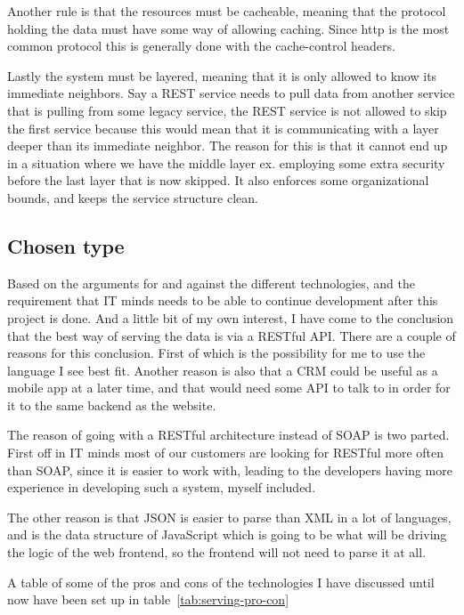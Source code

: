 Another rule is that the resources must be cacheable, meaning that the protocol holding the data must have some way of allowing caching. Since http is the most common protocol this is generally done with the cache-control headers\cite{rest:elkstein:architeture}.

Lastly the system must be layered\cite{rest:uci}, meaning that it is only allowed to know its immediate neighbors. Say a REST service needs to pull data from another service that is pulling from some legacy service, the REST service is not allowed to skip the first service because this would mean that it is communicating with a layer deeper than its immediate neighbor. The reason for this is that it cannot end up in a situation where we have the middle layer ex. employing some extra security before the last layer that is now skipped. It also enforces some organizational bounds, and keeps the service structure clean.

\subsection{Chosen type }
\label{sub:Chosen type}
Based on the arguments for and against the different technologies, and the requirement that IT minds needs to be able to continue development after this project is done. And a little bit of my own interest, I have come to the conclusion that the best way of serving the data is via a RESTful API. There are a couple of reasons for this conclusion. First of which is the possibility for me to use the language I see best fit. Another reason is also that a CRM could be useful as a mobile app at a later time, and that would need some API to talk to in order for it to the same backend as the website.

The reason of going with a RESTful architecture instead of SOAP is two parted. First off in IT minds most of our customers are looking for RESTful more often than SOAP, since it is easier to work with, leading to the developers having more experience in developing such a system, myself included.

The other reason is that JSON is easier to parse than XML in a lot of languages, and is the data structure of  JavaScript which is going to be what will be driving the logic of the web frontend, so the frontend will not need to parse it at all.

A table of some of the pros and cons of the technologies I have discussed until now have been set up in table~\ref{tab:serving-pro-con}

